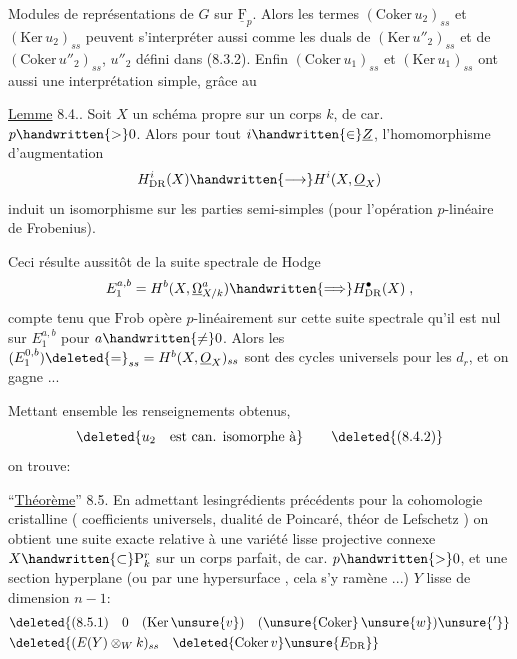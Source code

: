  Modules de représentations de $G$ sur $\underline{\mathrm F}_p$. Alors les termes $(\mathrm{Coker}\,u_2)_{ss}$ et $(\mathrm{Ker}\,u_2)_{ss}$ peuvent s'interpréter aussi comme les duals de $(\mathrm{Ker}\,u''_2)_{ss}$ et de $(\mathrm{Coker}\,u''_2)_{ss}$, $u''_2$ défini dans (8.3.2). Enfin  $(\mathrm{Coker}\,u_1)_{ss}$ et $(\mathrm{Ker}\,u_1)_{ss}$ ont aussi une interprétation simple, grâce au

\uline{Lemme} 8.4.. Soit $X$ un schéma propre sur un corps $k$, de car. $p\handwritten{>}0$. Alors pour tout $i\handwritten{\in}\underline Z$, l'homomorphisme d'augmentation 
\[
H^i_{\rm DR}(X)\handwritten{\longrightarrow}H^i(X,\underline O_X)
\]
induit un isomorphisme sur les parties semi-simples (pour l'opération $p$-linéaire de Frobenius).

Ceci résulte aussitôt de la suite spectrale de Hodge
\[
E^{a,b}_1=H^b(X,\underline\Omega^a_{X/k})\handwritten{\Longrightarrow}H^{\bullet}_{\rm DR}(X)\;,
\]
compte tenu que $\mathrm{Frob}$ opère  $p$-linéairement sur cette suite spectrale  qu'il est nul sur $E_1^{a,b}$ pour $a\handwritten{\ne}0$. Alors les $(E_1^{0,b})\deleted{=}_{ss}=H^b(X,\underline O_X)_{ss}$ sont des cycles universels pour les $d_r$, et on gagne ...

Mettant ensemble les renseignements obtenus, 
\[
\deleted{u_2\quad\text{est can. isomorphe à}}
\tag*{\deleted{(8.4.2)}}
\]
on trouve:

``\uline{Théorème}'' 8.5. En admettant les\handwritten{\,}ingrédients précédents pour la cohomologie cristalline ( coefficients universels, dualité de Poincaré, théor de Lefschetz  ) on obtient une suite exacte\handwritten{,} relative à une variété lisse projective connexe $X\handwritten{\subset}\mathrm P^r_k$  sur un corps parfait, de car. $p\handwritten{>}0$, et une section hyperplane (ou par une hypersurface , cela s'y ramène ...) $Y$ lisse de dimension $n-1$:
\[
\begin{aligned}
&\deleted{(8.5.1)\quad 0\quad (\mathrm{Ker}\,\unsure{v})\quad(\unsure{\mathrm{Coker}}\,\unsure{w})\unsure{'}}\\
&\deleted{(E(Y)\otimes_W k)_{ss}\quad\deleted{\mathrm{Coker}\,v}\unsure{E_{\rm DR}}}
\end{aligned}
\]

